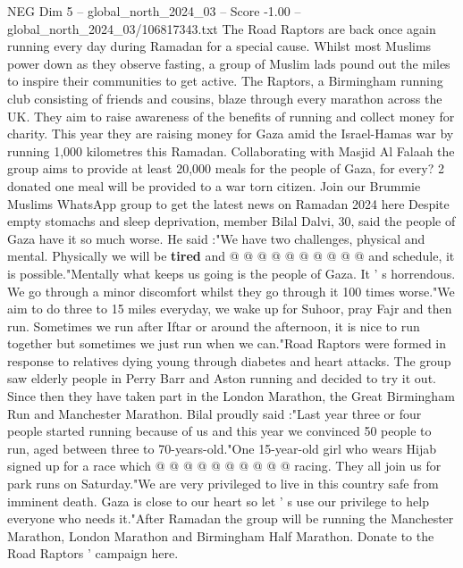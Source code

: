 \begin{textsample}{NEG Dim 5 – global\_north\_2024\_03 – Score -1.00 – global\_north\_2024\_03/106817343.txt}  \label{ex:f5_neg_169}
The Road Raptors are back once again running every day during Ramadan for a special cause.
Whilst most Muslims power down as they observe fasting, a group of Muslim lads pound out the miles to inspire their communities to get active.
The Raptors, a Birmingham running club consisting of friends and cousins, blaze through every marathon across the UK.
They aim to raise awareness of the benefits of running and collect money for charity.
This year they are raising money for Gaza amid the Israel-Hamas war by running 1,000 kilometres this Ramadan.
Collaborating with Masjid Al Falaah the group aims to provide at least 20,000 meals for the people of Gaza, for every? 2 donated one meal will be provided to a war torn citizen.
Join our Brummie Muslims WhatsApp group to get the latest news on Ramadan 2024 here Despite empty stomachs and sleep deprivation, member Bilal Dalvi, 30, said the people of Gaza have it so much worse.
He said :"We have two challenges, physical and mental.
Physically we will be \textbf{tired} and @ @ @ @ @ @ @ @ @ @ and schedule, it is possible."Mentally what keeps us going is the people of Gaza.
It ' s horrendous.
We go through a minor discomfort whilst they go through it 100 times worse."We aim to do three to 15 miles everyday, we wake up for Suhoor, pray Fajr and then run.
Sometimes we run after Iftar or around the afternoon, it is nice to run together but sometimes we just run when we can."Road Raptors were formed in response to relatives dying young through diabetes and heart attacks.
The group saw elderly people in Perry Barr and Aston running and decided to try it out.
Since then they have taken part in the London Marathon, the Great Birmingham Run and Manchester Marathon.
Bilal proudly said :"Last year three or four people started running because of us and this year we convinced 50 people to run, aged between three to 70-years-old."One 15-year-old girl who wears Hijab signed up for a race which @ @ @ @ @ @ @ @ @ @ racing.
They all join us for park runs on Saturday."We are very privileged to live in this country safe from imminent death.
Gaza is close to our heart so let ' s use our privilege to help everyone who needs it."After Ramadan the group will be running the Manchester Marathon, London Marathon and Birmingham Half Marathon.
Donate to the Road Raptors ' campaign here.

\end{textsample}
